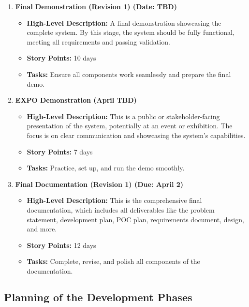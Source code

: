 \documentclass[12pt]{article}
\begin{document}
\begin{enumerate}
    \item \textbf{Final Demonstration (Revision 1) (Date: TBD)}
    \begin{itemize}
        \item \textbf{High-Level Description:} A final demonstration showcasing the complete system. By this stage, the system should be fully functional, meeting all requirements and passing validation.
        \item \textbf{Story Points:} 10 days
        \item \textbf{Tasks:} Ensure all components work seamlessly and prepare the final demo.
    \end{itemize}

    \item \textbf{EXPO Demonstration (April TBD)}
    \begin{itemize}
        \item \textbf{High-Level Description:} This is a public or stakeholder-facing presentation of the system, potentially at an event or exhibition. The focus is on clear communication and showcasing the system’s capabilities.
        \item \textbf{Story Points:} 7 days
        \item \textbf{Tasks:} Practice, set up, and run the demo smoothly.
    \end{itemize}

    \item \textbf{Final Documentation (Revision 1) (Due: April 2)}
    \begin{itemize}
        \item \textbf{High-Level Description:} This is the comprehensive final documentation, which includes all deliverables like the problem statement, development plan, POC plan, requirements document, design, and more.
        \item \textbf{Story Points:} 12 days
        \item \textbf{Tasks:} Complete, revise, and polish all components of the documentation.
    \end{itemize}

\end{enumerate}
\newpage
\subsection{Planning of the Development Phases}
\end{document}
